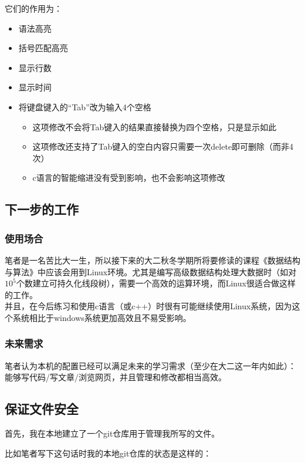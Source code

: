 \documentclass[UTF8]{article}
\begin{document}
它们的作用为：

\begin{itemize}
  \item 语法高亮
  \item 括号匹配高亮
  \item 显示行数
  \item 显示时间
  \item 将键盘键入的“Tab”改为输入4个空格
  \begin{itemize}
    \item 这项修改不会将Tab键入的结果直接替换为四个空格，只是显示如此
    \item 这项修改还支持了Tab键入的空白内容只需要一次delete即可删除（而非4次）
    \item c语言的智能缩进没有受到影响，也不会影响这项修改
  \end{itemize}
\end{itemize}

\subsection{下一步的工作}

\subsubsection{使用场合}

笔者是一名苦比大一生，所以接下来的大二秋冬学期所将要修读的课程《数据结构与算法》中应该会用到Linux环境。尤其是编写高级数据结构处理大数据时（如对$10^5$个数建立可持久化线段树），需要一个高效的运算环境，而Linux很适合做这样的工作。\\
并且，在今后练习和使用c语言（或c++）时很有可能继续使用Linux系统，因为这个系统相比于windows系统更加高效且不易受影响。

\subsubsection{未来需求}

笔者认为本机的配置已经可以满足未来的学习需求（至少在大二这一年内如此）：能够写代码/写文章/浏览网页，并且管理和修改都相当高效。

\subsection{保证文件安全}

首先，我在本地建立了一个git仓库用于管理我所写的文件。

比如笔者写下这句话时我的本地git仓库的状态是这样的：
\end{document}
